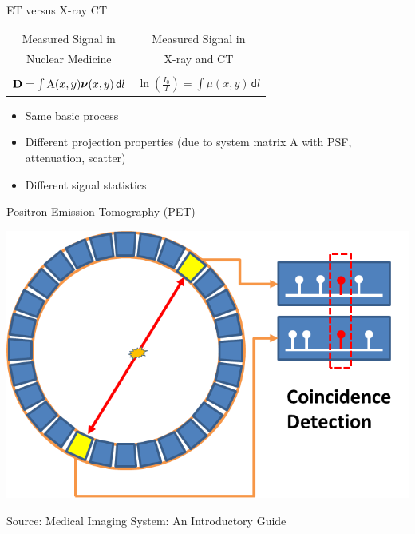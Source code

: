 \begin{frame}{ET versus X-ray CT}
    \begin{center}
        \begin{table}[ht]
            \begin{tabular}{c c}
                Measured Signal in                                                                & Measured Signal in                                                    \\
                Nuclear Medicine                                                                  & X-ray and CT                                                          \\
                                                                                                  &                                                                       \\
                {\LARGE $\mathbf{D}= \int \text{A}(x,y)\text{\boldmath$\nu$}(x,y)\,\mathsf{d}l $} & {\LARGE $ \ln\left(\frac{I_0}{I}\right)=\int \mu (x,y)\,\mathsf{d}l$} \\
            \end{tabular}
        \end{table}
        \bigskip
        \begin{itemize}
            \item {Same basic process}\\
            \item {Different projection properties (due to system matrix A with PSF, attenuation, scatter)}\\
            \item {Different signal statistics}
        \end{itemize}
    \end{center}
\end{frame}

\begin{frame}{Positron Emission Tomography (PET)}
    \begin{center}
        \includegraphics[height=0.7\textheight]{images/ring.png}

        \scriptsize Source: Medical Imaging System: An Introductory Guide~\cite{sanders18}
    \end{center}
\end{frame}

